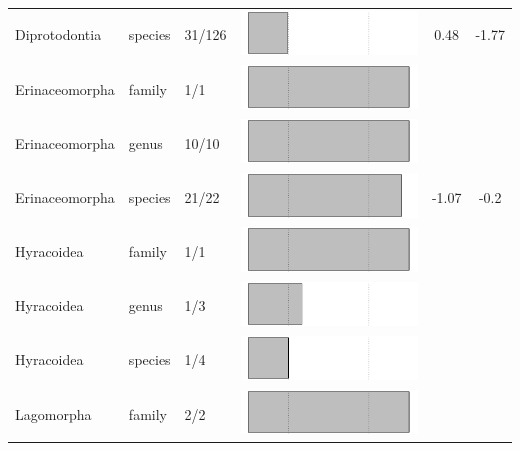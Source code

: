 \begin{longtable}{lL{1.8cm}C{2cm}lcc}
  Diprotodontia & species & 31/126 & \includegraphics[width=0.20\linewidth, height=0.05\linewidth]{Supplementaries/Figures/MissingMammals/Results_1c/Table_figures/bar27.pdf} & 0.48 & -1.77 \\ 
  Erinaceomorpha & family & 1/1 & \includegraphics[width=0.20\linewidth, height=0.05\linewidth]{Supplementaries/Figures/MissingMammals/Results_1c/Table_figures/bar28.pdf} &   &   \\ 
  Erinaceomorpha & genus & 10/10 & \includegraphics[width=0.20\linewidth, height=0.05\linewidth]{Supplementaries/Figures/MissingMammals/Results_1c/Table_figures/bar29.pdf} &   &   \\ 
  Erinaceomorpha & species & 21/22 & \includegraphics[width=0.20\linewidth, height=0.05\linewidth]{Supplementaries/Figures/MissingMammals/Results_1c/Table_figures/bar30.pdf} & -1.07 & -0.2 \\ 
  Hyracoidea & family & 1/1 & \includegraphics[width=0.20\linewidth, height=0.05\linewidth]{Supplementaries/Figures/MissingMammals/Results_1c/Table_figures/bar31.pdf} &   &   \\ 
  Hyracoidea & genus & 1/3 & \includegraphics[width=0.20\linewidth, height=0.05\linewidth]{Supplementaries/Figures/MissingMammals/Results_1c/Table_figures/bar32.pdf} &   &   \\ 
  Hyracoidea & species & 1/4 & \includegraphics[width=0.20\linewidth, height=0.05\linewidth]{Supplementaries/Figures/MissingMammals/Results_1c/Table_figures/bar33.pdf} &   &   \\ 
  Lagomorpha & family & 2/2 & \includegraphics[width=0.20\linewidth, height=0.05\linewidth]{Supplementaries/Figures/MissingMammals/Results_1c/Table_figures/bar34.pdf} &   &   \\ 

\end{longtable}
